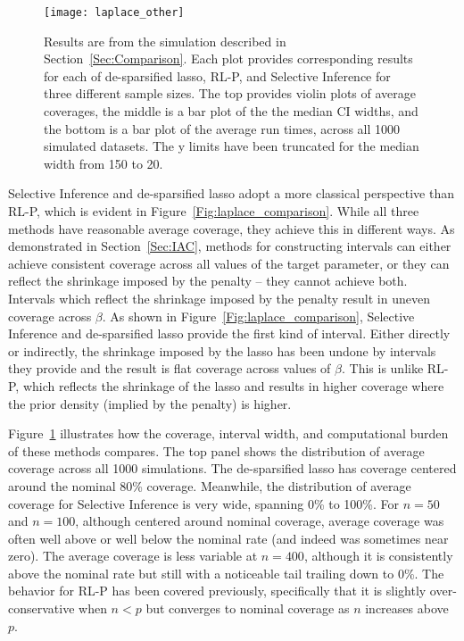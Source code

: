 \begin{figure}[htb!]
  \begin{center}
  \texttt{[image: laplace\_other]}
  \caption{\label{Fig:laplace_other} Results are from the simulation described in Section~\ref{Sec:Comparison}. Each plot provides corresponding results for each of de-sparsified lasso, RL-P, and Selective Inference for three different sample sizes. The top provides violin plots of average coverages, the middle is a bar plot of the the median CI widths, and the bottom is a bar plot of the average run times, across all 1000 simulated datasets. The y limits have been truncated for the median width from 150 to 20.}
  \end{center}
\end{figure}

Selective Inference and de-sparsified lasso adopt a more classical perspective than RL-P, which is evident in Figure~\ref{Fig:laplace_comparison}. While all three methods have reasonable average coverage, they achieve this in different ways. As demonstrated in Section~\ref{Sec:IAC}, methods for constructing intervals can either achieve consistent coverage across all values of the target parameter, or they can reflect the shrinkage imposed by the penalty -- they cannot achieve both. Intervals which reflect the shrinkage imposed by the penalty result in uneven coverage across $\beta$. As shown in Figure~\ref{Fig:laplace_comparison}, Selective Inference and de-sparsified lasso provide the first kind of interval. Either directly or indirectly, the shrinkage imposed by the lasso has been undone by intervals they provide and the result is flat coverage across values of $\beta$. This is unlike RL-P, which reflects the shrinkage of the lasso and results in higher coverage where the prior density (implied by the penalty) is higher.

Figure~\ref{Fig:laplace_other} illustrates how the coverage, interval width, and computational burden of these methods compares. The top panel shows the distribution of average coverage across all 1000 simulations. The de-sparsified lasso has coverage centered around the nominal 80\% coverage. Meanwhile, the distribution of average coverage for Selective Inference is very wide, spanning 0\% to 100\%. For $n = 50$ and $n = 100$, although centered around nominal coverage, average coverage was often well above or well below the nominal rate (and indeed was sometimes near zero). The average coverage is less variable at $n = 400$, although it is consistently above the nominal rate but still with a noticeable tail trailing down to 0\%. The behavior for RL-P has been covered previously, specifically that it is slightly over-conservative when $n < p$ but converges to nominal coverage as $n$ increases above $p$.

